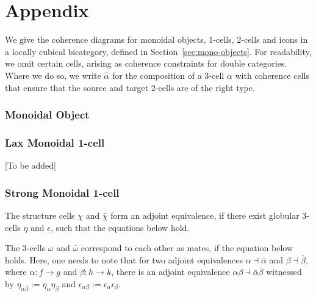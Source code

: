 \section{Appendix}
\label{ap:coherence}

We give the coherence diagrams for  monoidal objects, 1-cells, 2-cells and icons in a locally cubical bicategory, defined in Section~\ref{sec:mono-objects}. For readability, we omit certain cells, arising as coherence constraints for double categories. Where we do so, we write $\hat{\alpha}$ for the composition of a 3-cell ${\alpha}$ with coherence cells that ensure that the source and target 2-cells are of the right type.

\subsubsection*{Monoidal Object}

 \newpage
 \newpage
 \newpage


\subsubsection*{Lax Monoidal 1-cell}

[To be added]

\subsubsection*{Strong Monoidal 1-cell}

The structure cells $\chi$ and $\bar{\chi}$ form an adjoint equivalence, if  there exist globular 3-cells $\eta$ and $\epsilon$, such that the equations below hold. 



The 3-cells $\omega$ and $\bar{\omega}$ correspond to each other as mates, if the equation below holds. Here, one needs to note that for two adjoint equivalences $\alpha \dashv \bar{\alpha}$ and $\beta \dashv \bar{\beta}$, where $\alpha: f \rightarrow g$ and $\beta: h \rightarrow k$, there is an adjoint equivalence $\alpha \beta \dashv \bar{\alpha}\bar{\beta}$ witnessed by $\eta_{\alpha \beta} := \eta_{\alpha} \eta_{\beta}$ and $\epsilon_{\alpha \beta} :=  \epsilon_{\alpha} \epsilon_{\beta}$.  





